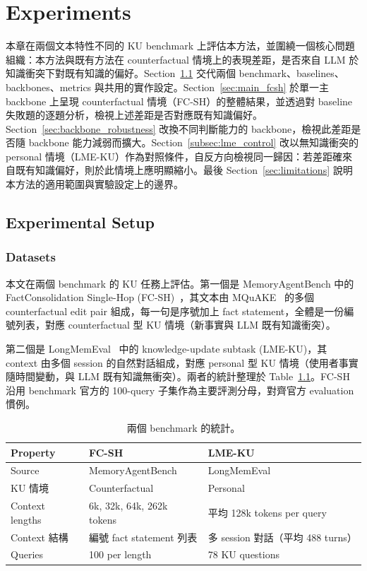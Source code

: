 \chapter{Experiments}
\label{ch:experiments}
 
本章在兩個文本特性不同的 KU benchmark 上評估本方法，並圍繞一個核心問題組織：本方法與既有方法在 counterfactual 情境上的表現差距，是否來自 LLM 於知識衝突下對既有知識的偏好。Section~\ref{sec:setup} 交代兩個 benchmark、baselines、backbones、metrics 與共用的實作設定。Section~\ref{sec:main_fcsh} 於單一主 backbone 上呈現 counterfactual 情境（FC-SH）的整體結果，並透過對 baseline 失敗題的逐題分析，檢視上述差距是否對應既有知識偏好。Section~\ref{sec:backbone_robustness} 改換不同判斷能力的 backbone，檢視此差距是否隨 backbone 能力減弱而擴大。Section~\ref{subsec:lme_control} 改以無知識衝突的 personal 情境（LME-KU）作為對照條件，自反方向檢視同一歸因：若差距確來自既有知識偏好，則於此情境上應明顯縮小。最後 Section~\ref{sec:limitations} 說明本方法的適用範圍與實驗設定上的邊界。
 
\section{Experimental Setup}
\label{sec:setup}
 
\subsection{Datasets}
\label{subsec:datasets}
 
本文在兩個 benchmark 的 KU 任務上評估。第一個是 MemoryAgentBench 中的 FactConsolidation Single-Hop (FC-SH)~\cite{hu2026evaluating}，其文本由 MQuAKE~\cite{zhong2023mquake} 的多個 counterfactual edit pair 組成，每一句是序號加上 fact statement，全體是一份編號列表，對應 counterfactual 型 KU 情境（新事實與 LLM 既有知識衝突）。
 
第二個是 LongMemEval~\cite{wulongmemeval} 中的 knowledge-update subtask (LME-KU)，其 context 由多個 session 的自然對話組成，對應 personal 型 KU 情境（使用者事實隨時間變動，與 LLM 既有知識無衝突）。兩者的統計整理於 Table~\ref{tab:datasets}。FC-SH 沿用 benchmark 官方的 100-query 子集作為主要評測分母，對齊官方 evaluation 慣例。
 
\begin{table}[!htb]
\centering
\caption{兩個 benchmark 的統計。}
\label{tab:datasets}
\small
\begin{tabularx}{\linewidth}{lXX}
\toprule
Property & FC-SH & LME-KU \\
\midrule
Source & MemoryAgentBench~\cite{hu2026evaluating} & LongMemEval~\cite{wulongmemeval} \\
KU 情境 & Counterfactual & Personal \\
Context lengths & 6k, 32k, 64k, 262k tokens & 平均 128k tokens per query \\
Context 結構 & 編號 fact statement 列表 & 多 session 對話（平均 488 turns）\\
Queries & 100 per length & 78 KU questions \\
\bottomrule
\end{tabularx}
\end{table}
 
